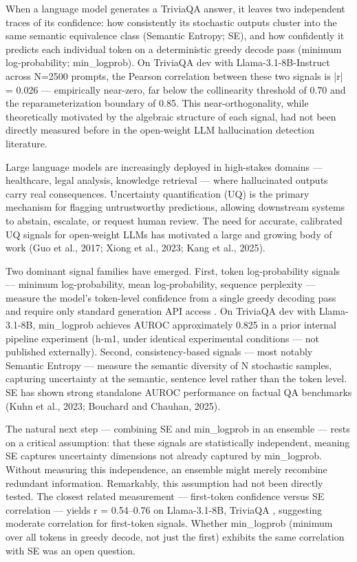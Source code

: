 
When a language model generates a TriviaQA answer, it leaves two independent traces of its confidence: how consistently its stochastic outputs cluster into the same semantic equivalence class (Semantic Entropy; SE), and how confidently it predicts each individual token on a deterministic greedy decode pass (minimum log-probability; min\_logprob). On TriviaQA dev with Llama-3.1-8B-Instruct across N=2500 prompts, the Pearson correlation between these two signals is |r| = 0.026 --- empirically near-zero, far below the collinearity threshold of 0.70 and the reparameterization boundary of 0.85. This near-orthogonality, while theoretically motivated by the algebraic structure of each signal, had not been directly measured before in the open-weight LLM hallucination detection literature.

Large language models are increasingly deployed in high-stakes domains --- healthcare, legal analysis, knowledge retrieval --- where hallucinated outputs carry real consequences. Uncertainty quantification (UQ) is the primary mechanism for flagging untrustworthy predictions, allowing downstream systems to abstain, escalate, or request human review. The need for accurate, calibrated UQ signals for open-weight LLMs has motivated a large and growing body of work (Guo et al., 2017; Xiong et al., 2023; Kang et al., 2025).

Two dominant signal families have emerged. First, token log-probability signals --- minimum log-probability, mean log-probability, sequence perplexity --- measure the model's token-level confidence from a single greedy decoding pass and require only standard generation API access \citep{Malinin2021Uncertainty}. On TriviaQA dev with Llama-3.1-8B, min\_logprob achieves AUROC approximately 0.825 in a prior internal pipeline experiment (h-m1, under identical experimental conditions --- not published externally). Second, consistency-based signals --- most notably Semantic Entropy \citep{Kuhn2023Semantic} --- measure the semantic diversity of N stochastic samples, capturing uncertainty at the semantic, sentence level rather than the token level. SE has shown strong standalone AUROC performance on factual QA benchmarks (Kuhn et al., 2023; Bouchard and Chauhan, 2025).

The natural next step --- combining SE and min\_logprob in an ensemble --- rests on a critical assumption: that these signals are statistically independent, meaning SE captures uncertainty dimensions not already captured by min\_logprob. Without measuring this independence, an ensemble might merely recombine redundant information. Remarkably, this assumption had not been directly tested. The closest related measurement --- first-token confidence versus SE correlation --- yields r = 0.54--0.76 on Llama-3.1-8B, TriviaQA \citep{Gabriel2026FirstToken}, suggesting moderate correlation for first-token signals. Whether min\_logprob (minimum over all tokens in greedy decode, not just the first) exhibits the same correlation with SE was an open question.


